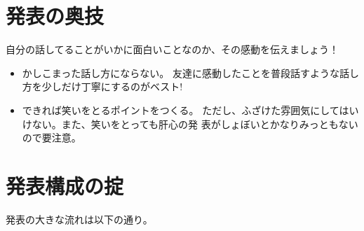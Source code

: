 \documentclass[12pt, ]{jsarticle}
\begin{document}
\hypertarget{ux767aux8868ux306eux5965ux6280}{%
\section{発表の奥技}\label{ux767aux8868ux306eux5965ux6280}}

自分の話してることがいかに面白いことなのか、その感動を伝えましょう！

\begin{itemize}
\item
  かしこまった話し方にならない。
  友達に感動したことを普段話すような話し方を少しだけ丁寧にするのがベスト!
\item
  できれば笑いをとるポイントをつくる。
  ただし、ふざけた雰囲気にしてはいけない。また、笑いをとっても肝心の発
  表がしょぼいとかなりみっともないので要注意。
\end{itemize}

\hypertarget{ux767aux8868ux69cbux6210ux306eux639f}{%
\section{発表構成の掟}\label{ux767aux8868ux69cbux6210ux306eux639f}}

発表の大きな流れは以下の通り。
\end{document}
